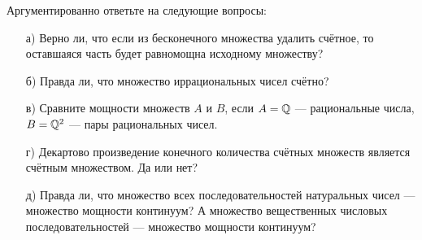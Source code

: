 \documentclass[12pt, a4paper, oneside]{article}
\begin{document}



\begin{problem}{}
Аргументированно ответьте на следующие вопросы:

\begin{enumerate} 
    \item[а)] Верно ли, что если из бесконечного множества удалить счётное, то оставшаяся часть будет равномощна исходному множеству?
    \item[б)] Правда ли, что множество иррациональных чисел счётно?
    \item[в)] Сравните мощности множеств $A$ и $B$, если $A = \mathbb Q$ --- рациональные числа, $B = \mathbb Q^{2}$ --- пары рациональных чисел.
    \item[г)] Декартово произведение конечного количества счётных множеств
является счётным множеством. Да или нет?
    \item[д)] Правда ли, что множество всех последовательностей натуральных чисел --- множество мощности континуум? А множество вещественных числовых последовательностей --- множество мощности континуум?
\end{enumerate} 
\end{problem}


\end{document}
